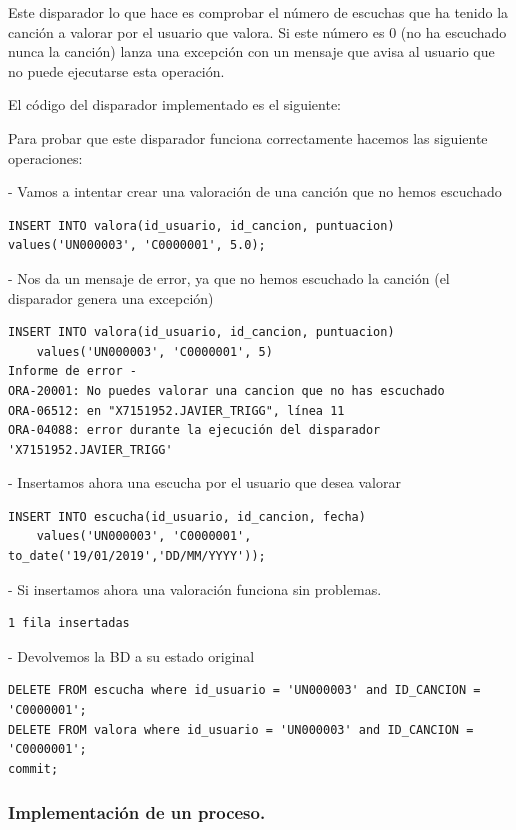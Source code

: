 \documentclass[12pt,a4paper]{article}
\begin{document}
Este disparador lo que hace es comprobar el número de escuchas que ha tenido la canción a valorar por el usuario que valora. Si este número es 0 (no ha escuchado nunca la canción) lanza una excepción con un mensaje que avisa al usuario que no puede ejecutarse esta operación.

El código del disparador implementado es el siguiente:



Para probar que este disparador funciona correctamente hacemos las siguiente operaciones:

- Vamos a intentar crear una valoración de una canción que no hemos escuchado
\begin{verbatim}
INSERT INTO valora(id_usuario, id_cancion, puntuacion) 
values('UN000003', 'C0000001', 5.0);
\end{verbatim}
- Nos da un mensaje de error, ya que no hemos escuchado la canción (el disparador genera una excepción)
\begin{verbatim}
INSERT INTO valora(id_usuario, id_cancion, puntuacion) 
	values('UN000003', 'C0000001', 5)
Informe de error -
ORA-20001: No puedes valorar una cancion que no has escuchado
ORA-06512: en "X7151952.JAVIER_TRIGG", línea 11
ORA-04088: error durante la ejecución del disparador 'X7151952.JAVIER_TRIGG'
\end{verbatim}

- Insertamos ahora una escucha por el usuario que desea valorar

\begin{verbatim}
INSERT INTO escucha(id_usuario, id_cancion, fecha) 
	values('UN000003', 'C0000001', to_date('19/01/2019','DD/MM/YYYY'));
\end{verbatim}
- Si insertamos ahora una valoración funciona sin problemas.
\begin{verbatim}
1 fila insertadas
\end{verbatim}

- Devolvemos la BD a su estado original
\begin{verbatim}
DELETE FROM escucha where id_usuario = 'UN000003' and ID_CANCION = 'C0000001';
DELETE FROM valora where id_usuario = 'UN000003' and ID_CANCION = 'C0000001';
commit;
\end{verbatim}

\subsubsection{Implementación de un proceso.}
	
\end{document}
